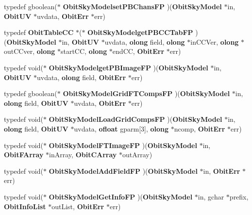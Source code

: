 \begin{CompactItemize}
typedef gboolean($\ast$ {\bf Obit\-Sky\-Modelset\-PBChans\-FP} )({\bf Obit\-Sky\-Model} $\ast$in, {\bf Obit\-UV} $\ast$uvdata, {\bf Obit\-Err} $\ast$err)
\item 
typedef {\bf Obit\-Table\-CC} $\ast$($\ast$ {\bf Obit\-Sky\-Modelget\-PBCCTab\-FP} )({\bf Obit\-Sky\-Model} $\ast$in, {\bf Obit\-UV} $\ast$uvdata, {\bf olong} field, {\bf olong} $\ast$in\-CCVer, {\bf olong} $\ast$out\-CCver, {\bf olong} $\ast$start\-CC, {\bf olong} $\ast$end\-CC, {\bf Obit\-Err} $\ast$err)
\item 
typedef void($\ast$ {\bf Obit\-Sky\-Modelget\-PBImage\-FP} )({\bf Obit\-Sky\-Model} $\ast$in, {\bf Obit\-UV} $\ast$uvdata, {\bf olong} field, {\bf Obit\-Err} $\ast$err)
\item 
typedef gboolean($\ast$ {\bf Obit\-Sky\-Model\-Grid\-FTComps\-FP} )({\bf Obit\-Sky\-Model} $\ast$in, {\bf olong} field, {\bf Obit\-UV} $\ast$uvdata, {\bf Obit\-Err} $\ast$err)
\item 
typedef void($\ast$ {\bf Obit\-Sky\-Model\-Load\-Grid\-Comps\-FP} )({\bf Obit\-Sky\-Model} $\ast$in, {\bf olong} field, {\bf Obit\-UV} $\ast$uvdata, {\bf ofloat} gparm[3], {\bf olong} $\ast$ncomp, {\bf Obit\-Err} $\ast$err)
\item 
typedef void($\ast$ {\bf Obit\-Sky\-Model\-FTImage\-FP} )({\bf Obit\-Sky\-Model} $\ast$in, {\bf Obit\-FArray} $\ast$in\-Array, {\bf Obit\-CArray} $\ast$out\-Array)
\item 
typedef void($\ast$ {\bf Obit\-Sky\-Model\-Add\-Field\-FP} )({\bf Obit\-Sky\-Model} $\ast$in, {\bf Obit\-Err} $\ast$err)
\item 
typedef void($\ast$ {\bf Obit\-Sky\-Model\-Get\-Info\-FP} )({\bf Obit\-Sky\-Model} $\ast$in, gchar $\ast$prefix, {\bf Obit\-Info\-List} $\ast$out\-List, {\bf Obit\-Err} $\ast$err)
\end{CompactItemize}
